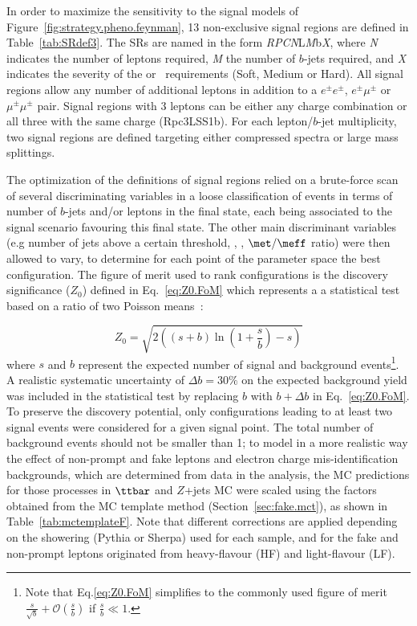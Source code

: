 In order to maximize the sensitivity to the signal models of Figure~\ref{fig:strategy.pheno.feynman}, 13 non-exclusive signal regions are defined in Table~\ref{tab:SRdef3}. 
The SRs are named in the form \textit{RPCN}L{\textit M}b{\textit X}, where {\textit N} indicates the number of leptons required, {\textit M} the number of $b$-jets required, and {\textit X} indicates the severity 
of the \met or \meff\ requirements (Soft, Medium or Hard). All signal regions allow any number of additional leptons in addition to a $e^\pm e^\pm$,
$e^\pm \mu^\pm$ or $\mu^\pm \mu^\pm$ pair. Signal regions with 3 leptons can be either any charge combination or all three with the same charge (Rpc3LSS1b).
For each lepton/$b$-jet multiplicity, two signal regions are defined targeting either compressed spectra or large mass splittings. 

The optimization of the definitions of signal regions relied on a brute-force
scan of several discriminating variables in a loose classification of events 
in terms of number of $b$-jets and/or leptons in the final state, each being 
associated to the signal scenario favouring this final state.
The other main discriminant variables (e.g number of jets above a certain \pt threshold, \meff, \met, $\met/\meff$ ratio) were then allowed to vary, 
to determine for each point of the parameter space the best configuration. 
The figure of merit used to rank configurations is the discovery significance ($Z_0$)
defined in Eq.~\ref{eq:Z0.FoM} which represents a
a statistical test based on a ratio of two Poisson means~\cite{Cousins:2009}:

\begin{equation}
Z_0 = \sqrt{2\left(\left(s+b\right)\ln\left(1+\frac{s}{b}\right)-s\right)}
\label{eq:Z0.FoM}
\end{equation}
where $s$ and $b$ represent the expected number of signal and background events\footnote{Note that Eq.\ref{eq:Z0.FoM} simplifies to the commonly used figure of merit 
$\frac{s}{\sqrt{b}} + \mathcal{O}\left(\frac{s}{b}\right)$ if $\frac{s}{b} \ll 1$.}.
A realistic systematic uncertainty of $\Delta b=30\%$ on the expected background yield 
was included in the statistical test by replacing $b$ with $b + \Delta b$ in Eq.~\ref{eq:Z0.FoM}.
To preserve the discovery potential, only configurations leading to at least two signal events were considered for a given signal point. The total number of background events should not be smaller than 1; to model in a more realistic way the effect of non-prompt and fake leptons and electron charge mis-identification backgrounds, 
which are determined from data in the analysis, 
the MC predictions for those processes in $\ttbar$ and $Z$+jets MC were scaled 
using the factors obtained from the MC template method (Section~\ref{sec:fake.mct}), as shown in Table~\ref{tab:mctemplateF}.
Note that different corrections are applied depending on the showering (Pythia or Sherpa) used for each sample, 
and for the fake and non-prompt leptons originated from heavy-flavour (HF) and light-flavour (LF).

